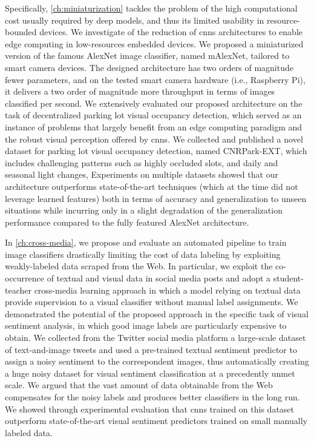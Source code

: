 Specifically, \ref{ch:miniaturization} tackles the problem of the high computational cost usually required by deep models, and thus its limited usability in resource-bounded devices.
We investigate of the reduction of \glspl{cnn} architectures to enable edge computing in low-resources embedded devices.
We proposed a miniaturized version of the famous AlexNet image classifier, named mAlexNet, tailored to smart camera devices.
The designed architecture has two orders of magnitude fewer parameters, and on the tested smart camera hardware (i.e., Raspberry Pi), it delivers a two order of magnitude more throughput in terms of images classified per second.
We extensively evaluated our proposed architecture on the task of decentralized parking lot visual occupancy detection, which served as an instance of problems that largely benefit from an edge computing paradigm and the robust visual perception offered by \glspl{cnn}.
We collected and published a novel dataset for parking lot visual occupancy detection, named CNRPark-EXT, which includes challenging patterns such as highly occluded slots, and daily and seasonal light changes,
Experiments on multiple datasets showed that our architecture outperforms state-of-the-art techniques (which at the time did not leverage learned features) both in terms of accuracy and generalization to unseen situations while incurring only in a slight degradation of the generalization performance compared to the fully featured AlexNet architecture.

In \ref{ch:cross-media}, we propose and evaluate an automated pipeline to train image classifiers drastically limiting the cost of data labeling by exploiting weakly-labeled data scraped from the Web.
In particular, we exploit the co-occurrence of textual and visual data in social media posts and adopt a student-teacher cross-media learning approach in which a model relying on textual data provide supervision to a visual classifier without manual label assignments.
We demonstrated the potential of the proposed approach in the specific task of visual sentiment analysis, in which good image labels are particularly expensive to obtain.
We collected from the Twitter social media platform a large-scale dataset of text-and-image tweets and used a pre-trained textual sentiment predictor to assign a noisy sentiment to the correspondent images, thus automatically creating a huge noisy dataset for visual sentiment classification at a precedently unmet scale.
We argued that the vast amount of data obtainable from the Web compensates for the noisy labels and produces better classifiers in the long run.
We showed through experimental evaluation that \glspl{cnn} trained on this dataset outperform state-of-the-art visual sentiment predictors trained on small manually labeled data.

